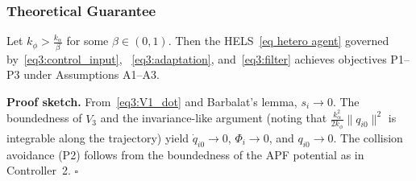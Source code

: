 \subsubsection{Theoretical Guarantee}

\begin{theorem}
	Let $k_\phi > \frac{k_\alpha}{\beta}$ for some $\beta \in (0,1)$.
	Then the HELS~\eqref{eq hetero agent} governed by~\eqref{eq3:control_input},
	~\eqref{eq3:adaptation}, and~\eqref{eq3:filter} achieves objectives P1--P3
	under Assumptions A1--A3.
\end{theorem}

\noindent\textbf{Proof sketch.}
From~\eqref{eq3:V1_dot} and Barbalat's lemma, $s_i \to 0$.
The boundedness of $V_3$ and the invariance-like argument
(noting that $\frac{k_\alpha^2}{2k_\phi}\|q_{i0}\|^2$ is integrable along the trajectory)
yield $\dot{q}_{i0} \to 0$, $\Phi_i \to 0$, and $q_{i0} \to 0$.
The collision avoidance (P2) follows from the boundedness of the APF potential
as in Controller~2.
\hfill$\square$